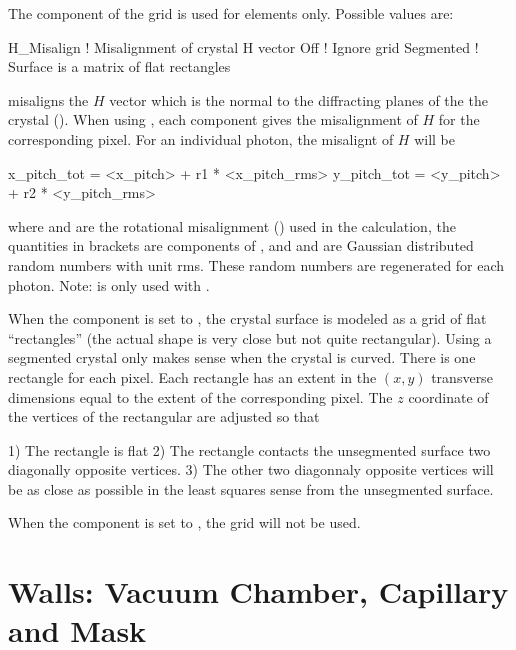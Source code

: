 The  component of the grid is used for
 elements only. Possible  values are:
\begin{example}
  H_Misalign         ! Misalignment of crystal H vector
  Off                ! Ignore grid
  Segmented          ! Surface is a matrix of flat rectangles
\end{example}
 misaligns the $H$ vector which is the normal to the
diffracting planes of the the crystal ().
When using , each  component gives the
misalignment of $H$ for the corresponding pixel. For an individual
photon, the misalignt of $H$ will be
\begin{example}
  x_pitch_tot = <x_pitch> + r1 * <x_pitch_rms>
  y_pitch_tot = <y_pitch> + r2 * <y_pitch_rms>
\end{example}
where  and  are the rotational
misalignment () used in the calculation, the quantities
in brackets  are components of , and  and
 are Gaussian distributed random numbers with unit rms. These
random numbers are regenerated for each photon. Note:  is only
used with .

When the  component is set to , the crystal
surface is modeled as a grid of flat ``rectangles'' (the actual shape
is very close but not quite rectangular). Using a segmented crystal
only makes sense when the crystal is curved. There is one rectangle
for each pixel. Each rectangle has an extent in the $(x,y)$ transverse
dimensions equal to the extent of the corresponding pixel. The $z$
coordinate of the vertices of the rectangular are adjusted so that 
\begin{example}
  1) The rectangle is flat
  2) The rectangle contacts the unsegmented surface two diagonally opposite vertices.
  3) The other two diagonnaly opposite vertices will be as close as possible in the
     least squares sense from the unsegmented surface.
\end{example}

When the  component is set to , the grid will not be used.

\section{Walls: Vacuum Chamber, Capillary and Mask}
\label{s:wall}

